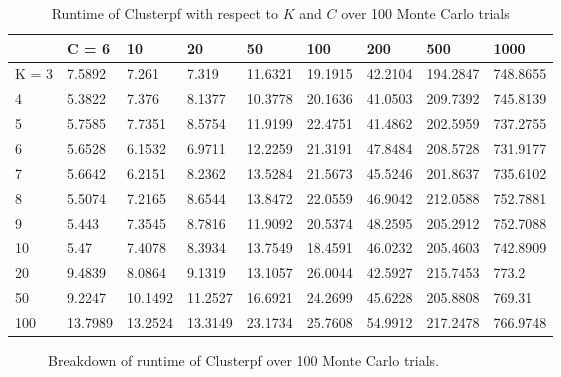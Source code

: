 \documentclass[10pt,letterpaper,final]{article}
\begin{document}
\begin{table}[h!]
\centering
\begin{tabular}{|l|l|l|l|l|l|l|l|l|}
\hline
      & C = 6   & 10      & 20      & 50      & 100     & 200     & 500      & 1000     \\ \hline
K = 3 & 7.5892  & 7.261   & 7.319   & 11.6321 & 19.1915 & 42.2104 & 194.2847 & 748.8655 \\ \hline
4     & 5.3822  & 7.376   & 8.1377  & 10.3778 & 20.1636 & 41.0503 & 209.7392 & 745.8139 \\ \hline
5     & 5.7585  & 7.7351  & 8.5754  & 11.9199 & 22.4751 & 41.4862 & 202.5959 & 737.2755 \\ \hline
6     & 5.6528  & 6.1532  & 6.9711  & 12.2259 & 21.3191 & 47.8484 & 208.5728 & 731.9177 \\ \hline
7     & 5.6642  & 6.2151  & 8.2362  & 13.5284 & 21.5673 & 45.5246 & 201.8637 & 735.6102 \\ \hline
8     & 5.5074  & 7.2165  & 8.6544  & 13.8472 & 22.0559 & 46.9042 & 212.0588 & 752.7881 \\ \hline
9     & 5.443   & 7.3545  & 8.7816  & 11.9092 & 20.5374 & 48.2595 & 205.2912 & 752.7088 \\ \hline
10    & 5.47    & 7.4078  & 8.3934  & 13.7549 & 18.4591 & 46.0232 & 205.4603 & 742.8909 \\ \hline
20    & 9.4839  & 8.0864  & 9.1319  & 13.1057 & 26.0044 & 42.5927 & 215.7453 & 773.2    \\ \hline
50    & 9.2247  & 10.1492 & 11.2527 & 16.6921 & 24.2699 & 45.6228 & 205.8808 & 769.31   \\ \hline
100   & 13.7989 & 13.2524 & 13.3149 & 23.1734 & 25.7608 & 54.9912 & 217.2478 & 766.9748 \\ \hline
\end{tabular}
\caption{Runtime of Clusterpf with respect to $K$ and $C$ over 100 Monte Carlo trials}
\label{tab:runtime_Clusterpf}
\end{table}

\begin{figure}
\centering
{}
\caption{Breakdown of runtime of Clusterpf over 100 Monte Carlo trials.}
\end{figure}
\end{document}
